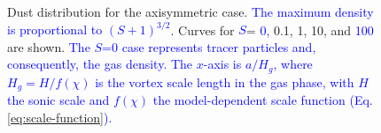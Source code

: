 \documentclass[apj]{emulateapj}
\def\blue#1{\textcolor{blue}{ #1}}
\newcommand{\eqp}[1]{(Eq. \ref{#1})}
\begin{document}
\begin{figure}
  \begin{center}
  \end{center}
\caption[]{Dust distribution for the axisymmetric case. \blue{The
    maximum density is proportional to $(S+1)^{3/2}$}. Curves for
  \blue{$S$}=\blue{0,} 0.1, 1, 10, and \blue{100} are shown. \blue{The
  $S$=0 case represents tracer particles and, consequently, the gas
  density. The $x$-axis is $a/H_g$, where $H_g=H/f(\chi)$ is the
  vortex scale length in the gas phase, with $H$ the sonic scale and
  $f(\chi)$ the model-dependent scale function
  \eqp{eq:scale-function}.}}
 \label{fig:gaussian}
\end{figure}
\end{document}
